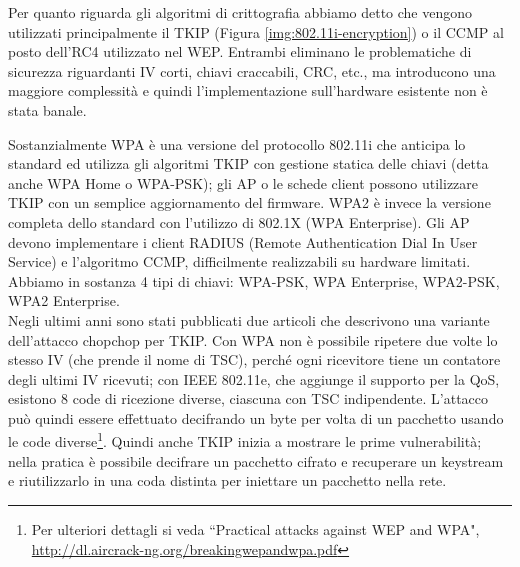 Per quanto riguarda gli algoritmi di crittografia abbiamo detto che vengono utilizzati principalmente il TKIP (Figura \ref{img:802.11i-encryption}) o il CCMP al posto dell'RC4 utilizzato nel WEP. Entrambi eliminano le problematiche di sicurezza riguardanti IV corti, chiavi craccabili, CRC, etc., ma introducono una maggiore complessità e quindi l'implementazione sull'hardware esistente non è stata banale.

Sostanzialmente WPA è una versione del protocollo 802.11i che anticipa lo standard ed utilizza gli algoritmi TKIP con gestione statica delle chiavi (detta anche WPA Home o WPA-PSK); gli AP o le schede client possono utilizzare TKIP con un semplice aggiornamento del firmware. WPA2 è invece la versione completa dello standard con l'utilizzo di 802.1X (WPA Enterprise). Gli AP devono implementare i client RADIUS (Remote Authentication Dial In User Service) e l'algoritmo CCMP, difficilmente realizzabili su hardware limitati. Abbiamo in sostanza 4 tipi di chiavi: WPA-PSK, WPA Enterprise, WPA2-PSK, WPA2 Enterprise.\\
Negli ultimi anni sono stati pubblicati due articoli che descrivono una variante dell'attacco chopchop per TKIP. Con WPA non è possibile ripetere due volte lo stesso IV (che prende il nome di TSC), perché ogni ricevitore tiene un contatore degli ultimi IV ricevuti; con IEEE 802.11e, che aggiunge il supporto per la QoS, esistono 8 code di ricezione diverse, ciascuna con TSC indipendente. L'attacco può quindi essere effettuato decifrando un byte per volta di un pacchetto usando le code diverse\footnote{Per ulteriori dettagli si veda \textquotedblleft Practical attacks against WEP and WPA", \url{http://dl.aircrack-ng.org/breakingwepandwpa.pdf}}. Quindi anche TKIP inizia a mostrare le prime vulnerabilità; nella pratica è possibile decifrare un pacchetto cifrato e recuperare un keystream e riutilizzarlo in una coda distinta per iniettare un pacchetto nella rete.

